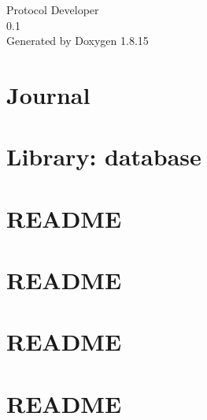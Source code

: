 \let\mypdfximage\pdfximage\def\pdfximage{\immediate\mypdfximage}\documentclass[twoside]{book}
\newcommand{\+}{\discretionary{\mbox{\scriptsize$\hookleftarrow$}}{}{}}
\newcommand{\clearemptydoublepage}{%
  \newpage{\pagestyle{empty}\cleardoublepage}%
}
\begin{document}
\hypersetup{pageanchor=false,
             bookmarksnumbered=true,
             pdfencoding=unicode
            }
\begin{titlepage}
\vspace*{7cm}
\begin{center}%
{\Large Protocol Developer \\[1ex]\large 0.\+1 }\\
\vspace*{1cm}
{\large Generated by Doxygen 1.8.15}\\
\end{center}
\end{titlepage}
\clearemptydoublepage
{}
\tableofcontents
\clearemptydoublepage
{}
\hypersetup{pageanchor=true}

\chapter{Journal}
\label{md_Journal}

\chapter{Library\+: database}
\label{md_myLibraries_database_README}

\chapter{R\+E\+A\+D\+ME}
\label{md_myLibraries_freeFunctionsAndWrappers_README}

\chapter{R\+E\+A\+D\+ME}
\label{md_myLibraries_gRPCInterface_README}

\chapter{R\+E\+A\+D\+ME}
\label{md_myLibraries_helloWorldProtocol_README}

\chapter{R\+E\+A\+D\+ME}
\label{md_myLibraries_libnetworkCommunication_README}

\end{document}
